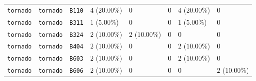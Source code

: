 \begin{table}
\begin{tabular}{llllllll}
\texttt{tornado} & \texttt{tornado} & \texttt{B110} & $4$ ($20.00\%$) & $0$ & $0$ & $4$ ($20.00\%$) & $0$ \\
\texttt{tornado} & \texttt{tornado} & \texttt{B311} & $1$ ($5.00\%$) & $0$ & $0$ & $1$ ($5.00\%$) & $0$ \\
\texttt{tornado} & \texttt{tornado} & \texttt{B324} & $2$ ($10.00\%$) & $2$ ($10.00\%$) & $0$ & $0$ & $0$ \\
\texttt{tornado} & \texttt{tornado} & \texttt{B404} & $2$ ($10.00\%$) & $0$ & $0$ & $2$ ($10.00\%$) & $0$ \\
\texttt{tornado} & \texttt{tornado} & \texttt{B603} & $2$ ($10.00\%$) & $0$ & $0$ & $2$ ($10.00\%$) & $0$ \\
\texttt{tornado} & \texttt{tornado} & \texttt{B606} & $2$ ($10.00\%$) & $0$ & $0$ & $0$ & $2$ ($10.00\%$) \\
\bottomrule
\end{tabular}
\end{table}
